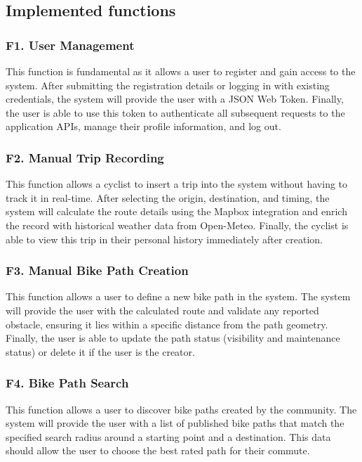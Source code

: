\subsection{Implemented functions}
\subsubsection*{F1. User Management}
This function is fundamental as it allows a user to register and gain access to the system.
After submitting the registration details or logging in with existing credentials, the system will provide the user with a JSON Web Token.
Finally, the user is able to use this token to authenticate all subsequent requests to the application APIs, manage their profile information, and log out.

\subsubsection*{F2. Manual Trip Recording}
This function allows a cyclist to insert a trip into the system without having to track it in real-time.
After selecting the origin, destination, and timing, the system will calculate the route details using the Mapbox integration and enrich the record with historical weather data from Open-Meteo.
Finally, the cyclist is able to view this trip in their personal history immediately after creation.

\subsubsection*{F3. Manual Bike Path Creation}
This function allows a user to define a new bike path in the system.
The system will provide the user with the calculated route and validate any reported obstacle, ensuring it lies within a specific distance from the path geometry.
Finally, the user is able to update the path status (visibility and maintenance status) or delete it if the user is the creator.

\subsubsection*{F4. Bike Path Search}
This function allows a user to discover bike paths created by the community.
The system will provide the user with a list of published bike paths that match the specified search radius around a starting point and a destination.
This data should allow the user to choose the best rated path for their commute.

